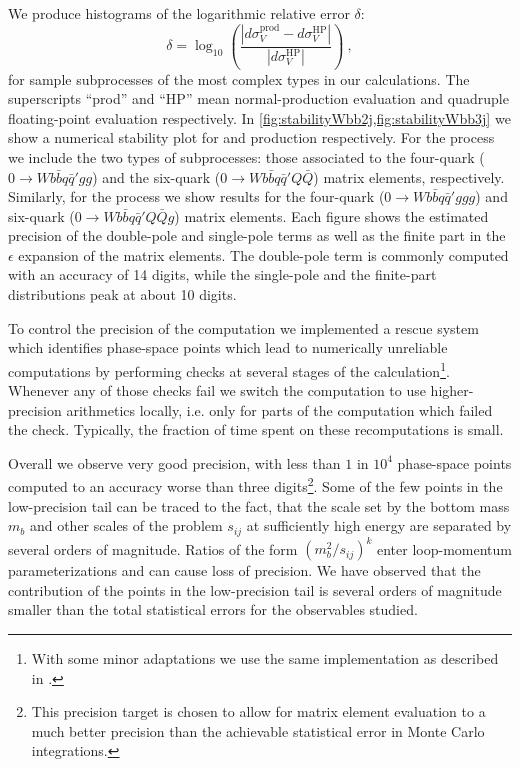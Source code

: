 We produce histograms of the logarithmic relative error $\delta$:
\begin{equation}
  \delta = \log_{10}\left(\frac{\left|d\sigma^{\text{prod}}_V - d\sigma^{\text{HP}}_V\right|}{\left|d\sigma^{\text{HP}}_V\right|}\right)\ ,
  \label{reldiff}
\end{equation}
for sample subprocesses of the most complex types in our calculations. 
The superscripts ``prod'' and ``HP'' mean normal-production evaluation and
quadruple floating-point evaluation respectively.
In \cref{fig:stabilityWbb2j,fig:stabilityWbb3j} we show a numerical stability plot for \Wbbjj{} and
\Wbbjjj{} production respectively. For the \Wbbjj{} process we include the two types of
subprocesses: those associated to the four-quark ($0\rightarrow Wb{\bar b}q{\bar q}'gg$)
and the six-quark ($0\rightarrow Wb{\bar b}q{\bar q}'Q{\bar Q}$) matrix elements, respectively.
Similarly, for the \Wbbjjj{} process we show results for the four-quark ($0\rightarrow Wb{\bar b}q{\bar q}'ggg$)
and six-quark ($0\rightarrow Wb{\bar b}q{\bar q}'Q{\bar Q}g$) matrix elements.
%
Each figure shows the estimated precision of the double-pole and
single-pole terms as well as the finite part in the $\epsilon$ expansion of the 
matrix elements. The double-pole term is
commonly computed with an accuracy of 14 digits, while the single-pole and the
finite-part distributions peak at about 10 digits.

To control the precision of the computation we implemented a rescue system which 
identifies phase-space points 
which lead to numerically unreliable computations
by performing checks at several
stages of the calculation\footnote{With some minor adaptations we use the same
implementation as described in \cite{Berger:2008sj,BH:W3jDistributions}.}. Whenever
any of those checks fail we switch the computation to use higher-precision 
arithmetics  locally, i.e. only for parts of the computation which failed the check.
Typically, the fraction of time spent on these recomputations is small.

Overall we observe
very good precision, with less than $1$ in $10^4$ phase-space
points computed to an accuracy worse than three digits\footnote{This precision target 
is chosen to allow for matrix element evaluation to a much better
precision than the achievable statistical 
error in Monte Carlo integrations.}.
%
Some of the few points in the low-precision tail
can be traced
to the fact, that the scale set by the bottom mass $m_b$ and other scales of the problem $s_{ij}$ at
sufficiently high energy are separated by several orders of magnitude.
Ratios of the form $(m_b^2/s_{ij})^k$ enter loop-momentum parameterizations and can cause loss of precision.
%
We have observed that
the contribution of the points in the low-precision tail is several orders of magnitude smaller than the total
statistical errors for the observables studied.

